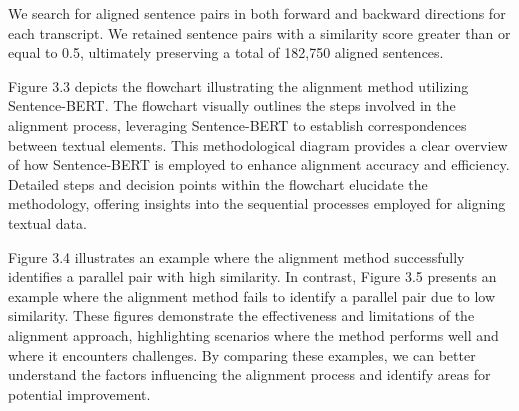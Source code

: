 \documentclass[PhD]{PHlab-thesis}
\begin{document}
We search for aligned sentence pairs in both forward and backward directions for each transcript. We retained sentence pairs with a similarity score greater than or equal to 0.5, ultimately preserving a total of 182,750 aligned sentences.

Figure 3.3 depicts the flowchart illustrating the alignment method utilizing Sentence-BERT. The flowchart visually outlines the steps involved in the alignment process, leveraging Sentence-BERT to establish correspondences between textual elements. This methodological diagram provides a clear overview of how Sentence-BERT is employed to enhance alignment accuracy and efficiency. Detailed steps and decision points within the flowchart elucidate the methodology, offering insights into the sequential processes employed for aligning textual data.

Figure 3.4 illustrates an example where the alignment method successfully identifies a parallel pair with high similarity. In contrast, Figure 3.5 presents an example where the alignment method fails to identify a parallel pair due to low similarity. These figures demonstrate the effectiveness and limitations of the alignment approach, highlighting scenarios where the method performs well and where it encounters challenges. By comparing these examples, we can better understand the factors influencing the alignment process and identify areas for potential improvement.
\end{document}
